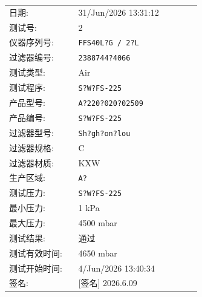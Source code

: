 \documentclass[UTF8,10pt,a4paper,fontset=fandol]{ctexart}
\newcommand{\fieldvalue}[1]{#1}
\newcommand{\handwritten}[1]{#1}
\begin{document}
\begin{tabular}{@{}p{0.32\linewidth}p{0.58\linewidth}@{}}
日期: &
\fieldvalue{31/Jun/2026 13:31:12}
\\[2pt]
测试号: &
\fieldvalue{2}
\\[2pt]
仪器序列号: &
\fieldvalue{\texttt{FFS40L?G / 2?L}}
\\[2pt]
过滤器编号: &
\fieldvalue{\texttt{2388744?4066}}
\\[2pt]
测试类型: &
\fieldvalue{Air}
\\[2pt]
测试程序: &
\fieldvalue{\texttt{S?W?FS-225}}
\\[2pt]
产品型号: &
\fieldvalue{\texttt{A?220?020?02509}}
\\[2pt]
产品编号: &
\fieldvalue{\texttt{S?W?FS-225}}
\\[2pt]
过滤器型号: &
\fieldvalue{\texttt{Sh?gh?on?lou}}
\\[2pt]
过滤器规格: &
\fieldvalue{C}
\\[2pt]
过滤器材质: &
\fieldvalue{KXW}
\\[2pt]
生产区域: &
\fieldvalue{\texttt{A?}}
\\[2pt]
测试压力: &
\fieldvalue{\texttt{S?W?FS-225}}
\\[2pt]
最小压力: &
\fieldvalue{1 kPa}
\\[2pt]
最大压力: &
\fieldvalue{4500 mbar}
\\[2pt]
测试结果: &
\fieldvalue{通过}
\\[2pt]
测试有效时间: &
\fieldvalue{4650 mbar}
\\[2pt]
测试开始时间: &
\fieldvalue{4/Jun/2026 13:40:34}
\\[2pt]
签名: &
\fieldvalue{\handwritten{[签名] 2026.6.09}}
\end{tabular}
\end{document}
